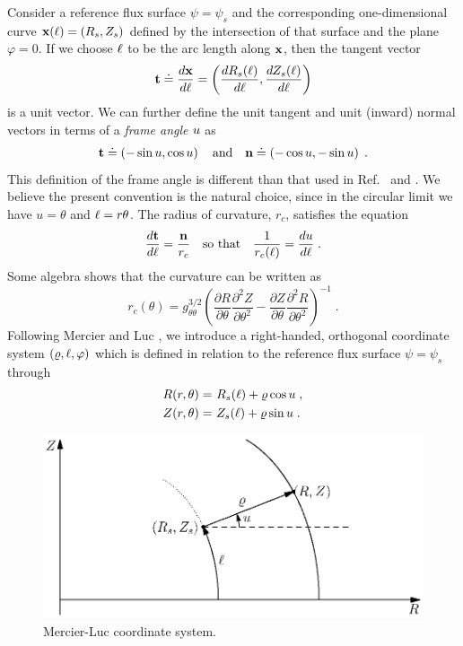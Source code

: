 Consider a reference flux surface $\psi = \psi_s$ 
and the corresponding one-dimensional curve $\mathbf{x}(\ell)=(R_s,Z_s)$
defined by the intersection of that surface and 
the plane $\varphi=0$.  If we choose $\ell$ to be
the arc length along $\mathbf{x}$, then the tangent vector 
%
\begin{equation}
{\bf t} \doteq \frac{d\mathbf{x}}{d\ell} = \left( 
\frac{d R_s(\ell)}{d\ell},\frac{d Z_s(\ell)}{d\ell} 
\right)
\end{equation}
%
is a unit vector.  We can further define the unit 
tangent and unit (inward) normal vectors in terms 
of a {\it frame angle} $u$ \cite{guggenheimer:1977} as
%
\begin{equation}
{\bf t} \doteq \left( -\sin u,\cos u \right) \quad
\mbox{and} \quad
{\bf n} \doteq \left(-\cos u,-\sin u \right) \; .
\end{equation}
%
This definition of the frame angle is different than that 
used in Ref.~\cite{miller:1998} and \cite{waltz:1999}.
We believe the present convention is the natural choice, 
since in the circular limit we have $u=\theta$ and 
$\ell=r\theta$.  The radius of curvature, $r_c$, satisfies 
the equation
%
\begin{equation}
\frac{d{\bf t}}{d\ell} = \frac{{\bf n}}{r_c} \quad
\mbox{so that}
\quad
\frac{1}{r_c(\ell)} = \frac{d u}{d \ell} \; . 
\end{equation}
%
Some algebra shows that the curvature can be written as
%
\begin{equation}
r_c(\theta) = g_{\theta\theta}^{3/2} \left( 
\frac{\partial R}{\partial\theta}\frac{\partial^2 Z}{\partial\theta^2}-
\frac{\partial Z}{\partial\theta}\frac{\partial^2 R}{\partial\theta^2}
\right)^{-1} \; .
\end{equation}
%
Following Mercier and Luc \cite{mercier:1974}, we introduce 
a right-handed, orthogonal coordinate system $(\varrho,\ell,\varphi)$ 
which is defined in relation to the reference flux surface 
$\psi = \psi_s$ through
%
\begin{align}
R(r,\theta) = &~R_s(\ell) + \varrho \cos u \; , 
 \label{eq.rml} \\
Z(r,\theta) = &~Z_s(\ell) + \varrho \sin u \; . 
 \label{eq.zml}
\end{align}
%
\begin{figure}
\begin{center}
\includegraphics[scale=0.9]{figures/geom2.eps}
\caption{Mercier-Luc coordinate system.}
\label{fig.geom2}
\end{center}
\end{figure}
